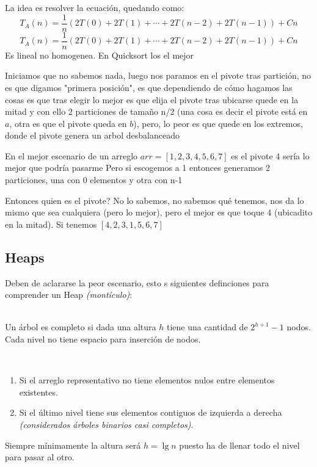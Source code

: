 \documentclass[tikz,11pt,fleqn]{book} %
\begin{document}
La idea es resolver la ecuación, quedando como:
$$
	T_A(n)=\frac1n(2T(0)+2T(1)+\cdots+2T(n-2)+2T(n-1))+Cn
$$ $$
	T_A(n)=\frac1n(2T(0)+2T(1)+\cdots+2T(n-2)+2T(n-1))+Cn
$$
Es lineal no homogenea.
En Quicksort los el mejor

Iniciamos que no sabemos nada, luego nos paramos en el pivote tras partición, no es que digamos "primera posición", es que dependiendo de cómo hagamos las cosas es que tras elegir lo mejor es que elija el pivote tras ubicarse quede en la mitad y con ello 2 particiones de tamaño n/2 (una cosa es decir el pivote está en $a$, otra es que el pivote queda en $b$), pero, lo peor es que quede en los extremos, donde el pivote genera un arbol desbalanceado

En el mejor escenario de un arreglo $arr=[1,2,3,4,5,6,7]$ es el pivote 4 sería lo mejor que podría pasarme
Pero si escogemos a 1 entonces generamos 2 particiones, una con 0 elementos y otra con n-1

Entonces quien es el pivote? No lo sabemos, no sabemos qué tenemos, nos da lo mismo que sea cualquiera (pero lo mejor), pero el mejor es que toque 4 (ubicadito en la mitad). Si tenemos $[4,2,3,1,5,6,7]$




\subsection{Heaps}
Deben de aclararse la peor escenario, esto s siguientes definciones para comprender un Heap \textit{(montículo)}:

\begin{definition}~\\
	Un árbol es completo si dada una altura $h$ tiene una cantidad de $2^{h+1}-1$ nodos. Cada nivel no tiene espacio para inserción de nodos.
\end{definition}

\begin{definition}~
	\begin{enumerate}
		\item Si el arreglo representativo no tiene elementos nulos entre elementos existentes.
		\item Si el último nivel tiene sus elementos contiguos de izquierda a derecha \textit{(considerados árboles binarios casi completos)}.
	\end{enumerate}
	Siempre mínimamente la altura será $h=\lg n$ puesto ha de llenar todo el nivel para pasar al otro.
\end{definition}
\end{document}
